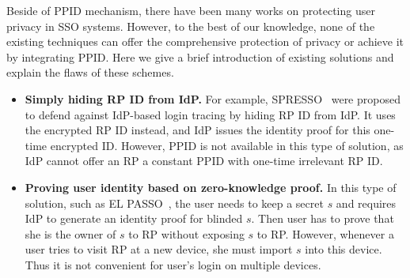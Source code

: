 Beside of PPID mechanism, there have been many works on protecting user privacy in SSO systems. 
However, to the best of our knowledge, none of the existing techniques can offer the comprehensive protection of privacy or achieve it by integrating PPID. 
Here we give a brief introduction of existing solutions
and explain the flaws of these schemes. 
\begin{itemize}
\item {\noindent\textbf{ Simply hiding RP ID from IdP. }}For example, SPRESSO~\cite{SPRESSO} were proposed to defend against IdP-based login tracing by hiding RP ID from IdP. It uses the encrypted RP ID instead, and IdP issues the identity proof for this one-time encrypted ID. 
However, PPID is not available in this type of solution, as IdP cannot offer an RP a constant PPID with one-time irrelevant RP ID.
\item {\noindent\textbf{Proving user identity based on zero-knowledge proof. }}In this type of solution, such as EL PASSO~\cite{ZhangKSZR21}, the user needs to keep a secret $s$ and requires IdP to generate an identity proof for blinded $s$. Then user has to prove that she is the owner of $s$ to RP without exposing $s$ to RP. 
However, whenever a user tries to visit RP at a new device, she must import  $s$ into this device. Thus it is not convenient for user's login on multiple devices. 
\end{itemize}



